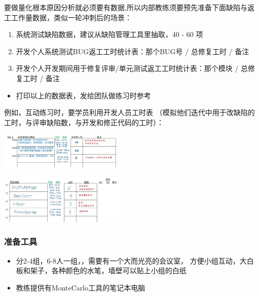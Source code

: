 要做量化根本原因分析就必须要有数据,所以内部教练须要预先准备下面缺陷与返工工作量数据，类似一轮冲刺后的场景：

\begin{enumerate}
\tightlist
\item
  系统测试缺陷数据，建议从缺陷管理工具里抽取，40 - 60 项
\item
  开发个人系统测试BUG返工工时统计表：那个BUG号 / 总修复工时 / 备注
\item
  开发个人开发期间用于修复评审/单元测试返工工时统计表：那个模块 /
  总修复工时 / 备注
\end{enumerate}

\begin{itemize}
\tightlist
\item
  打印以上的数据表，发给团队做练习时参考
\end{itemize}

例如，互动练习时，要学员利用开发人员工时表
（模拟他们迭代中用于改缺陷的工时，与评审缺陷数，与开发和修正代码的工时）：


\includegraphics[width=6cm]{缺陷表41.jpg}


\includegraphics[width=6cm]{缺陷表51.jpg}

\hypertarget{ux51c6ux5907ux5de5ux5177}{%
\subsubsection{准备工具}\label{ux51c6ux5907ux5de5ux5177}}

\begin{itemize}
\tightlist
\item
  分2-4组，6-8人一组，，需要有一个大而光亮的会议室，
  方便小组互动，大白板和架子，各种颜色的水笔，墙壁可以贴上小组的白纸
\item
  教练提供有MonteCarlo工具的笔记本电脑
\end{itemize}

